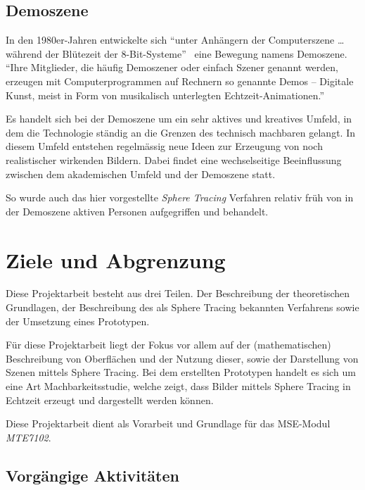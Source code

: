 \subsection{Demoszene}
\label{subsec:demoscene}

In den 1980er-Jahren entwickelte sich ``unter Anhängern der
Computerszene \dots{} während der Blütezeit der
8-Bit-Systeme''~\parencite{wikipedia_foundation_demoszene_2015} eine Bewegung
namens Demoszene. ``Ihre Mitglieder, die häufig Demoszener oder einfach
Szener genannt werden, erzeugen mit Computerprogrammen auf Rechnern so
genannte Demos – Digitale Kunst, meist in Form von musikalisch
unterlegten
Echtzeit-Animationen.''~\parencite{wikipedia_foundation_demoszene_2015}

Es handelt sich bei der Demoszene um ein sehr aktives und kreatives
Umfeld, in dem die Technologie ständig an die Grenzen des technisch
machbaren gelangt. In diesem Umfeld entstehen regelmässig neue Ideen zur
Erzeugung von noch realistischer wirkenden Bildern. Dabei findet eine
wechselseitige Beeinflussung zwischen dem akademischen Umfeld und der
Demoszene statt.

So wurde auch das hier vorgestellte \textit{Sphere Tracing} Verfahren
relativ früh von in der Demoszene aktiven Personen aufgegriffen und
behandelt.

\section{Ziele und Abgrenzung}
\label{sec:objectives}

Diese Projektarbeit besteht aus drei Teilen. Der Beschreibung der
theoretischen Grundlagen, der Beschreibung des als Sphere Tracing
bekannten Verfahrens sowie der Umsetzung eines Prototypen.

Für diese Projektarbeit liegt der Fokus vor allem auf der
(mathematischen) Beschreibung von Oberflächen und der Nutzung dieser,
sowie der Darstellung von Szenen mittels Sphere Tracing. Bei dem
erstellten Prototypen handelt es sich um eine Art Machbarkeitsstudie,
welche zeigt, dass Bilder mittels Sphere Tracing in Echtzeit erzeugt und
dargestellt werden können.

Diese Projektarbeit dient als Vorarbeit und Grundlage für das MSE-Modul
\textit{MTE7102}.

\subsection{Vorgängige Aktivitäten}
\label{subsec:preliminaries}

